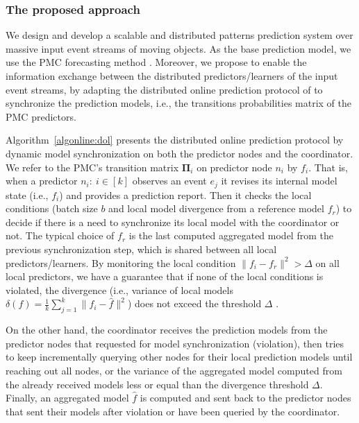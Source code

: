 %

\subsubsection{The proposed approach}
\label{sec:proposed_approach}
\par We design and develop a scalable and distributed patterns prediction system over massive input event streams of moving objects. As the base prediction model, we use the PMC forecasting method \cite{alevizos2017event}. Moreover,  we propose to enable the information exchange between the distributed predictors/learners of the input event streams, by adapting the distributed online prediction protocol of \cite{kamp2014communication} to synchronize the prediction models, i.e., the transitions probabilities matrix of the PMC predictors.

\par Algorithm~\ref{algonline:dol} presents the distributed online prediction protocol by dynamic model synchronization on both the predictor nodes and the coordinator. We refer to the PMC's transition matrix $\boldsymbol{\Pi}_i$ on predictor node $n_i$ by $f_i$. That is, when a predictor $n_i:\ i \in[k]$ observes an event $e_j$ it revises its internal model state (i.e., $f_i$) and provides a prediction report. Then it checks the local conditions  (batch size $b$ and local model divergence from a reference model $f_r$) to decide if there is a need to synchronize its local model with the coordinator or not. The typical choice of $f_r$ is the last computed aggregated model from the previous synchronization step, which is shared between all local predictors/learners. By monitoring the local condition $\|f_i - f_r\|^2 > \Delta$ on all local predictors, we have a guarantee that if none of the local conditions is violated, the divergence (i.e., variance of local models $\delta(f)=\frac{1}{k} \sum_{j=1}^{k}\|f_i - \hat{f}\|^2$) does not exceed the threshold $\Delta$ \cite{kamp2014communication}. 

\par On the other hand, the coordinator receives the prediction models from the predictor nodes that requested for model synchronization (violation), then tries to keep incrementally querying other nodes for their local prediction models until reaching out all nodes, or the variance of the aggregated model computed from the already received models less or equal than the divergence threshold  $\Delta$. Finally, an aggregated model $\hat{f}$ is computed and sent back to the predictor nodes that sent their models after violation or have been queried by the coordinator.

